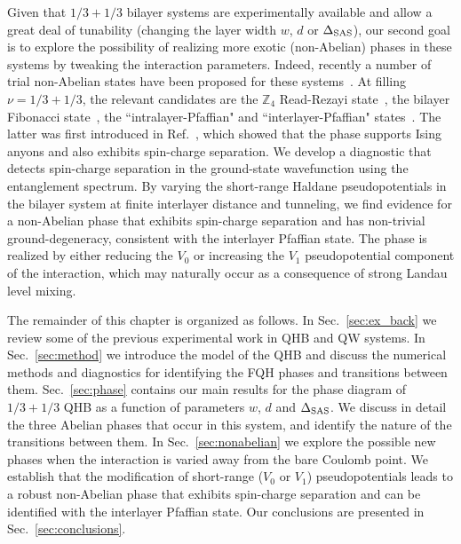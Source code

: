 Given that $1/3+1/3$ bilayer systems are experimentally available and allow a great deal of tunability (changing the layer width $w$, $d$ or $\Delta_\textrm{SAS}$), our second goal is to explore the possibility of realizing more exotic (non-Abelian) phases in these systems by tweaking the interaction parameters. 
Indeed, recently a number of trial non-Abelian states have been proposed for these systems~\cite{Ardonne02, Barkeshli10, RezayiZ4, BondersonSlingerland, Barkeshli11, Barkeshli14, Vaezi14}.
At filling $\nu=1/3+1/3$, the relevant candidates are the $\mathbb{Z}_4$ Read-Rezayi state~\cite{Read-PhysRevB.59.8084}, the bilayer Fibonacci state~\cite{Vaezi14}, the ``intralayer-Pfaffian" and ``interlayer-Pfaffian" states~\cite{Barkeshli10}. 
The latter was first introduced in Ref.~\cite{Ardonne02}, which showed that the phase supports Ising anyons and also exhibits spin-charge separation.
We develop a diagnostic that detects spin-charge separation in the ground-state wavefunction using the entanglement spectrum. 
By varying the short-range Haldane pseudopotentials in the bilayer system at finite interlayer distance and tunneling, we find evidence for a non-Abelian phase that exhibits spin-charge separation and has non-trivial ground-degeneracy, consistent with the interlayer Pfaffian state. 
The phase is realized by either reducing the $V_0$ or increasing the $V_1$ pseudopotential component of the interaction, which may naturally occur as a consequence of strong Landau level mixing.    

The remainder of this chapter is organized as follows.
In Sec.~\ref{sec:ex_back} we review some of the previous experimental work in QHB and QW systems.
In Sec.~\ref{sec:method} we introduce the model of the QHB and discuss the numerical methods and diagnostics for identifying the FQH phases and transitions between them. 
Sec.~\ref{sec:phase} contains our main results for the phase diagram of $1/3+1/3$ QHB as a function of parameters $w$, $d$ and $\Delta_\textrm{SAS}$. 
We discuss in detail the three Abelian phases that occur in this system, and identify the nature of the transitions between them. 
In Sec.~\ref{sec:nonabelian} we explore the possible new phases when the interaction is varied away from the bare Coulomb point. 
We establish that the modification of short-range ($V_0$ or $V_1$) pseudopotentials leads to a robust non-Abelian phase that exhibits spin-charge separation and can be identified with the interlayer Pfaffian state.
Our conclusions are presented in Sec.~\ref{sec:conclusions}.

